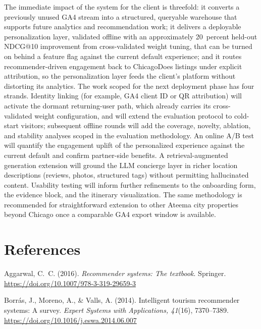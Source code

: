 \documentclass[12pt,letterpaper]{article}
\begin{document}
The immediate impact of the system for the client is threefold: it
converts a previously unused GA4 stream into a structured,
queryable warehouse that supports future analytics and recommendation
work; it delivers a deployable personalization layer, validated
offline with an approximately 20~percent held-out NDCG@10 improvement
from cross-validated weight tuning, that can be turned on behind a
feature flag against the current default experience; and it routes
recommender-driven engagement back to ChicagoDoes listings under
explicit attribution, so the personalization layer feeds the client's
platform without distorting its analytics. The work scoped for the
next deployment phase has four strands. Identity linking (for
example, GA4 client ID or QR attribution) will activate the dormant
returning-user path, which already carries its cross-validated weight
configuration, and will extend the evaluation protocol to cold-start
visitors; subsequent offline rounds will add the coverage, novelty,
ablation, and stability analyses scoped in the evaluation
methodology. An online A/B test will quantify the engagement uplift of
the personalized experience against the current default and confirm
partner-side benefits. A retrieval-augmented generation extension
will ground the LLM concierge layer in richer location descriptions
(reviews, photos, structured tags) without permitting hallucinated
content. Usability testing will inform further refinements to the
onboarding form, the evidence block, and the itinerary visualization.
The same methodology is recommended for straightforward extension to
other Ateema city properties beyond Chicago once a comparable GA4
export window is available.

\section{References}\label{sec:references}
\begingroup
\singlespacing
\setlength{\parskip}{6pt}
\newcommand{\refitem}{\par\hangindent=0.5in\noindent}

\refitem
Aggarwal, C.~C. (2016). \textit{Recommender systems: The textbook}. Springer. \url{https://doi.org/10.1007/978-3-319-29659-3}

\refitem
Borr\'{a}s, J., Moreno, A., \& Valls, A. (2014). Intelligent tourism recommender systems: A survey. \textit{Expert Systems with Applications, 41}(16), 7370--7389. \url{https://doi.org/10.1016/j.eswa.2014.06.007}
\end{document}
